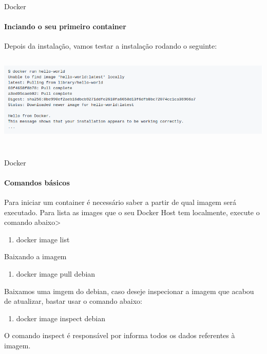\documentclass{beamer}
\begin{document}
\begin{frame}{Docker}
    \framesubtitle{Inciando o seu primeiro container}
    Depois da instala\c{c}\~ao, vamos testar a instala\c{c}\~ao rodando o seguinte:
    \includegraphics[height=5cm]{img/hello.png}
\end{frame}

\setwatermark{\fontsize{125pt}{125pt}\selectfont{Simple}}
\begin{frame}{Docker}
    \framesubtitle{Comandos básicos}
    Para iniciar um container \'e necess\'ario saber a partir de qual imagem será executado. Para lista as
    images que o seu Docker Host tem localmente, execute o comando abaixo>
    \begin{enumerate}
        \item  docker image list
    \end{enumerate}
    Baixando a imagem
    \begin{enumerate}
        \item docker image pull debian
    \end{enumerate}
    Baixamos uma imgem do debian, caso deseje inspecionar a imagem que acabou de atualizar, bastar usar o comando abaixo:
    \begin{enumerate}
        \item docker image inspect debian
    \end{enumerate}
    O comando inspect \'e respons\'avel por informa todos os dados referentes \`a imagem.
\end{frame}
\end{document}
